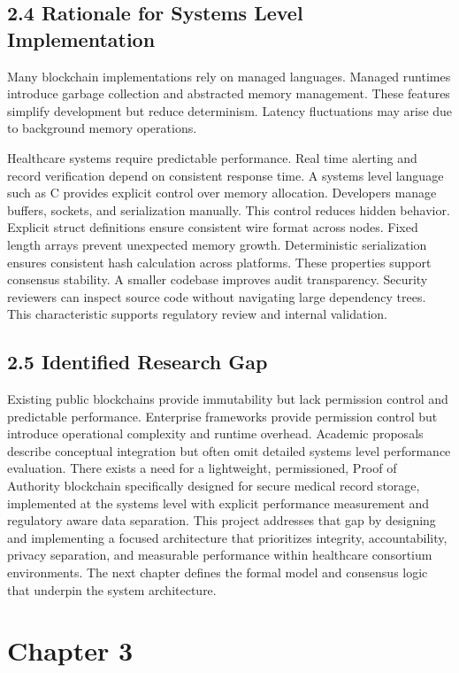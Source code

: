 \subsection*{2.4 Rationale for Systems Level Implementation}
Many blockchain implementations rely on managed languages. Managed runtimes introduce garbage collection and abstracted memory management. These features simplify development but reduce determinism. Latency fluctuations may arise due to background memory operations.

Healthcare systems require predictable performance. Real time alerting and record verification depend on consistent response time. A systems level language such as C provides explicit control over memory allocation. Developers manage buffers, sockets, and serialization manually. This control reduces hidden behavior.
Explicit struct definitions ensure consistent wire format across nodes. Fixed length arrays prevent unexpected memory growth. Deterministic serialization ensures consistent hash calculation across platforms. These properties support consensus stability.
A smaller codebase improves audit transparency. Security reviewers can inspect source code without navigating large dependency trees. This characteristic supports regulatory review and internal validation.

\subsection*{2.5 Identified Research Gap}
Existing public blockchains provide immutability but lack permission control and predictable performance.
Enterprise frameworks provide permission control but introduce operational complexity and runtime overhead.
Academic proposals describe conceptual integration but often omit detailed systems level performance evaluation.
There exists a need for a lightweight, permissioned, Proof of Authority blockchain specifically designed for secure medical record storage, implemented at the systems level with explicit performance measurement and regulatory aware data separation.
This project addresses that gap by designing and implementing a focused architecture that prioritizes integrity, accountability, privacy separation, and measurable performance within healthcare consortium environments.
The next chapter defines the formal model and consensus logic that underpin the system architecture.

\newpage
\section*{Chapter 3}
\label{ch:3}
